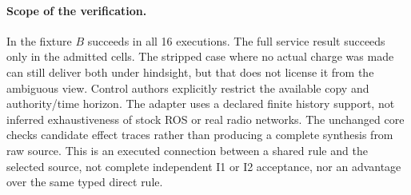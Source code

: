 \documentclass[11pt]{article}
\begin{document}
\paragraph{Scope of the verification.}
In the fixture \(B\) succeeds in all 16 executions.
The full service result succeeds only in the
admitted cells. The stripped case where no actual charge
was made can still deliver both under hindsight, but
that does not license it from the ambiguous view.
Control authors explicitly restrict the available copy
and authority/time horizon. The adapter uses a declared
finite history support, not inferred exhaustiveness
of stock ROS or real radio networks. The unchanged core
checks candidate effect traces rather than producing a
complete synthesis from raw source. This is an
executed connection between a shared rule and the
selected source, not complete independent I1 or I2
acceptance, nor an advantage over the same typed direct rule.
\end{document}
